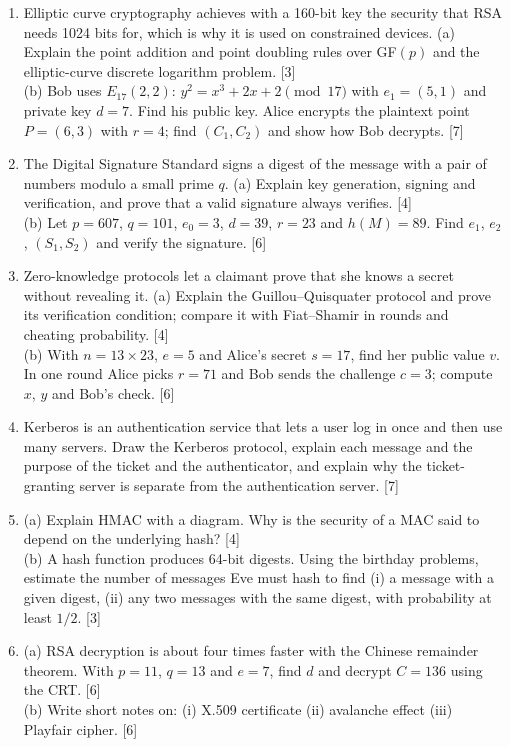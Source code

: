 \begin{enumerate}[leftmargin=2em,itemsep=7pt,label=\textbf{Q\arabic*.}]
\item Elliptic curve cryptography achieves with a 160-bit key the security that RSA needs 1024 bits for, which is why it is used on constrained devices. (a) Explain the point addition and point doubling rules over GF$(p)$ and the elliptic-curve discrete logarithm problem. \hfill [3]\\
(b) Bob uses $E_{17}(2, 2)$: $y^2 = x^3 + 2x + 2 \pmod{17}$ with $e_1 = (5, 1)$ and private key $d = 7$. Find his public key. Alice encrypts the plaintext point $P = (6, 3)$ with $r = 4$; find $(C_1, C_2)$ and show how Bob decrypts. \hfill [7]

\item The Digital Signature Standard signs a digest of the message with a pair of numbers modulo a small prime $q$. (a) Explain key generation, signing and verification, and prove that a valid signature always verifies. \hfill [4]\\
(b) Let $p = 607$, $q = 101$, $e_0 = 3$, $d = 39$, $r = 23$ and $h(M) = 89$. Find $e_1$, $e_2$, $(S_1, S_2)$ and verify the signature. \hfill [6]

\item Zero-knowledge protocols let a claimant prove that she knows a secret without revealing it. (a) Explain the Guillou--Quisquater protocol and prove its verification condition; compare it with Fiat--Shamir in rounds and cheating probability. \hfill [4]\\
(b) With $n = 13 \times 23$, $e = 5$ and Alice's secret $s = 17$, find her public value $v$. In one round Alice picks $r = 71$ and Bob sends the challenge $c = 3$; compute $x$, $y$ and Bob's check. \hfill [6]

\item Kerberos is an authentication service that lets a user log in once and then use many servers. Draw the Kerberos protocol, explain each message and the purpose of the ticket and the authenticator, and explain why the ticket-granting server is separate from the authentication server. \hfill [7]

\item (a) Explain HMAC with a diagram. Why is the security of a MAC said to depend on the underlying hash? \hfill [4]\\
(b) A hash function produces 64-bit digests. Using the birthday problems, estimate the number of messages Eve must hash to find (i) a message with a given digest, (ii) any two messages with the same digest, with probability at least $1/2$. \hfill [3]

\item (a) RSA decryption is about four times faster with the Chinese remainder theorem. With $p = 11$, $q = 13$ and $e = 7$, find $d$ and decrypt $C = 136$ using the CRT. \hfill [6]\\
(b) Write short notes on: (i) X.509 certificate (ii) avalanche effect (iii) Playfair cipher. \hfill [6]
\end{enumerate}

